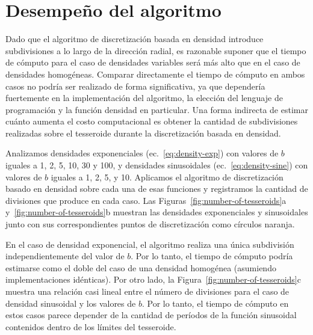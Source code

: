 
\section{Desempeño del algoritmo}

Dado que el algoritmo de discretización basada en densidad introduce
subdivisiones a lo largo de la dirección radial, es razonable suponer que el
tiempo de cómputo para el caso de densidades variables será más alto que en el
caso de densidades homogéneas.
Comparar directamente el tiempo de cómputo en ambos casos no podría ser
realizado de forma significativa, ya que dependería fuertemente en la
implementación del algoritmo, la elección del lenguaje de programación y la
función densidad en particular.
Una forma indirecta de estimar cuánto aumenta el costo computacional es obtener
la cantidad de subdivisiones realizadas sobre el tesseroide durante la
discretización basada en densidad.

Analizamos densidades exponenciales (ec.~\ref{eq:density-exp}) con valores de
$b$ iguales a 1, 2, 5, 10, 30 y 100, y densidades sinusoidales
(ec.~\ref{eq:density-sine}) con valores de $b$ iguales a 1, 2, 5, y 10.
Aplicamos el algoritmo de discretización basado en densidad sobre cada una de
esas funciones y registramos la cantidad de divisiones que produce en cada
caso.
Las Figuras~\ref{fig:number-of-tesseroids}a y~\ref{fig:number-of-tesseroids}b
muestran las densidades exponenciales y sinusoidales junto con sus
correspondientes puntos de discretización como círculos naranja.

En el caso de densidad exponencial, el algoritmo realiza una única subdivisión
independientemente del valor de $b$.
Por lo tanto, el tiempo de cómputo podría estimarse como el doble del caso de
una densidad homogénea (asumiendo implementaciones idénticas).
Por otro lado, la Figura~\ref{fig:number-of-tesseroids}c muestra una relación
casi lineal entre el número de divisiones para el caso de densidad sinusoidal
y los valores de $b$.
Por lo tanto, el tiempo de cómputo en estos casos parece depender de la
cantidad de períodos de la función sinusoidal contenidos dentro de los límites
del tesseroide.

